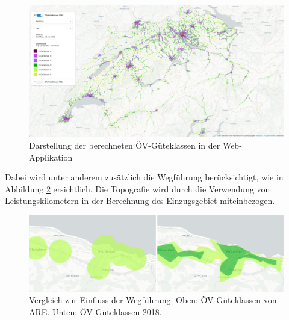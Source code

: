 \begin{figure}[ht]
    \centering
    \includegraphics[width=1\linewidth]{technicalreport/img/resultat_oevgk18_uebersicht}
    \caption[Darstellung der berechneten ÖV-Güteklassen in der Web-Applikation]{Darstellung der berechneten ÖV-Güteklassen in der Web-Applikation}
    \label{fig:mntg_sum_resultat_webapp_uebersicht}
\end{figure}

Dabei wird unter anderem zusätzlich die Wegführung berücksichtigt, wie in Abbildung \ref{fig:mgmt_summary_vergleich_wegfuehrung} ersichtlich.
Die Topografie wird durch die Verwendung von Leistungskilometern in der Berechnung des Einzugsgebiet miteinbezogen.

\begin{figure}[ht]
    \centering
    \includegraphics[width=0.8\linewidth]{start/img/vergleich_wegfuehrung}
    \caption[Vergleich zur Einfluss der Wegführung]{Vergleich zur Einfluss der Wegführung. Oben: ÖV-Güteklassen von \ac{ARE}. Unten: ÖV-Güteklassen 2018.}
    \label{fig:mgmt_summary_vergleich_wegfuehrung}
\end{figure}

